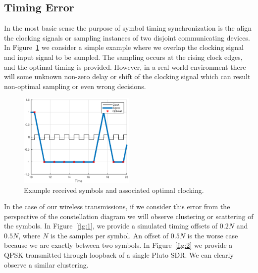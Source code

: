 \documentclass[letterpaper,12pt]{article}
\begin{document}
\subsection{Timing Error}
%
In the most basic sense the purpose of symbol timing synchronization is the align the clocking signals or 
sampling instances of two disjoint communicating devices.  In Figure~\ref{fig:clocking} we consider a simple example where we overlap the clocking signal and input signal to be sampled.  The sampling occurs at the rising clock edges, and the optimal timing is provided.  However, in a real-world environment there will some unknown non-zero delay or shift of the clocking signal which can result non-optimal sampling or even wrong decisions.\par
%
\begin{figure}[!ht]
 \centering
 \includegraphics[width=0.5\textwidth]{clocking.eps}
\caption{Example received symbols and associated optimal clocking.}
\label{fig:clocking}
\end{figure} 
%
In the case of our wireless transmissions, if we consider this error from the perspective of the constellation diagram we will observe clustering or scattering of the symbols.  In Figure~\ref{fig:1}, we provide a simulated timing offsets of $0.2N$ and $0.5N$, where $N$ is the samples per symbol.  An offset of $0.5N$ is the worse case because we are exactly between two symbols.  In Figure~\ref{fig:2} we provide a QPSK transmitted through loopback of a single Pluto SDR.  We can clearly observe a similar clustering.\par  %
\end{document}
